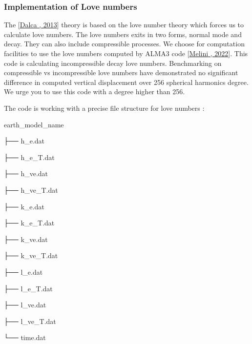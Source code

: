 \documentclass[letterpaper,10pt,english]{sphinxmanual}
\begin{document}
\subsubsection{Implementation of Love numbers}
\label{\detokenize{numerical_imp:implementation-of-love-numbers}}\label{\detokenize{numerical_imp:love}}
\sphinxAtStartPar
The {[}\hyperlink{cite.index:id3}{Dalca , 2013}{]} theory is based on the love number theory which forces us to calculate love numbers. The love numbers exits in two forms, normal mode and decay. They can also include compressible processes. We choose for computation facilities to use the love numbers computed by ALMA3 code {[}\hyperlink{cite.index:id7}{Melini , 2022}{]}. This code is calculating incompressible decay love numbers. Benchmarking on compressible vs incompressible love numbers have demonstrated no significant difference in computed vertical displacement over 256 spherical harmonics degree. We urge you to use this code with a degree higher than 256.

\sphinxAtStartPar
The code is working with a precise file structure for love numbers :

\begin{DUlineblock}{0em}
\item[] earth\_model\_name
\item[] ├── h\_e.dat
\item[] ├── h\_e\_T.dat
\item[] ├── h\_ve.dat
\item[] ├── h\_ve\_T.dat
\item[] ├── k\_e.dat
\item[] ├── k\_e\_T.dat
\item[] ├── k\_ve.dat
\item[] ├── k\_ve\_T.dat
\item[] ├── l\_e.dat
\item[] ├── l\_e\_T.dat
\item[] ├── l\_ve.dat
\item[] ├── l\_ve\_T.dat
\item[] └── time.dat
\end{DUlineblock}
\end{document}
